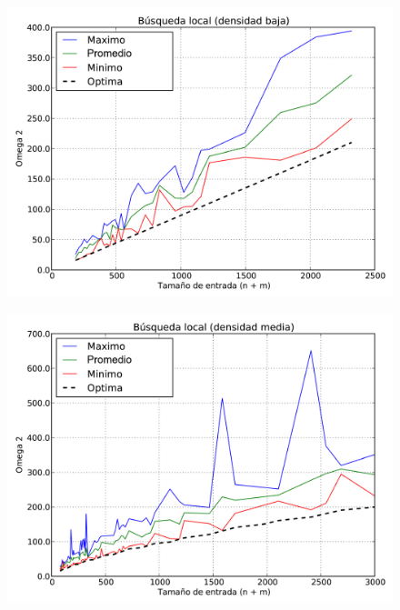 \begin{figure}[H]
\begin{center}
\includegraphics[angle=0, scale=.75]{imagenes/local_search_densidad_baja.pdf}
\label{grafico local}
\end{center}
\end{figure}

\begin{figure}[H]
\begin{center}
\includegraphics[angle=0, scale=.75]{imagenes/local_search_densidad_media.pdf}
\label{grafico local}
\end{center}
\end{figure}

